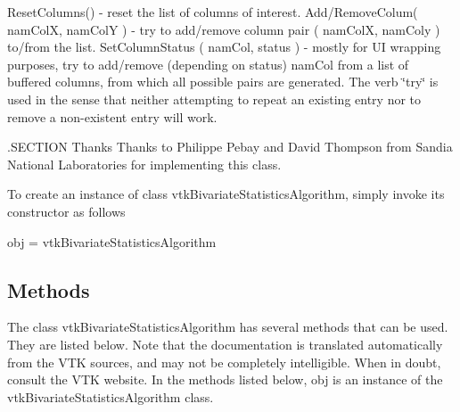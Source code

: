 Reset\-Columns() -\/ reset the list of columns of interest. Add/\-Remove\-Colum( nam\-Col\-X, nam\-Col\-Y ) -\/ try to add/remove column pair ( nam\-Col\-X, nam\-Coly ) to/from the list. Set\-Column\-Status ( nam\-Col, status ) -\/ mostly for U\-I wrapping purposes, try to add/remove (depending on status) nam\-Col from a list of buffered columns, from which all possible pairs are generated. The verb \char`\"{}try\char`\"{} is used in the sense that neither attempting to repeat an existing entry nor to remove a non-\/existent entry will work.

.S\-E\-C\-T\-I\-O\-N Thanks Thanks to Philippe Pebay and David Thompson from Sandia National Laboratories for implementing this class.

To create an instance of class vtk\-Bivariate\-Statistics\-Algorithm, simply invoke its constructor as follows \begin{DoxyVerb}  obj = vtkBivariateStatisticsAlgorithm
\end{DoxyVerb}
 \hypertarget{vtkwidgets_vtkxyplotwidget_Methods}{}\subsection{Methods}\label{vtkwidgets_vtkxyplotwidget_Methods}
The class vtk\-Bivariate\-Statistics\-Algorithm has several methods that can be used. They are listed below. Note that the documentation is translated automatically from the V\-T\-K sources, and may not be completely intelligible. When in doubt, consult the V\-T\-K website. In the methods listed below, {\ttfamily obj} is an instance of the vtk\-Bivariate\-Statistics\-Algorithm class. 
